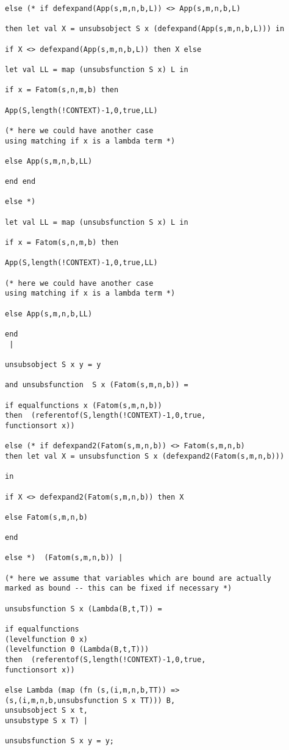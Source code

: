 \documentclass[12pt]{article}
\begin{document}
\begin{verbatim}
else (* if defexpand(App(s,m,n,b,L)) <> App(s,m,n,b,L)

then let val X = unsubsobject S x (defexpand(App(s,m,n,b,L))) in

if X <> defexpand(App(s,m,n,b,L)) then X else

let val LL = map (unsubsfunction S x) L in

if x = Fatom(s,n,m,b) then

App(S,length(!CONTEXT)-1,0,true,LL)

(* here we could have another case
using matching if x is a lambda term *)

else App(s,m,n,b,LL)

end end

else *)

let val LL = map (unsubsfunction S x) L in

if x = Fatom(s,n,m,b) then

App(S,length(!CONTEXT)-1,0,true,LL)

(* here we could have another case
using matching if x is a lambda term *)

else App(s,m,n,b,LL)

end 
 |

unsubsobject S x y = y

and unsubsfunction  S x (Fatom(s,m,n,b)) =

if equalfunctions x (Fatom(s,m,n,b))  
then  (referentof(S,length(!CONTEXT)-1,0,true,
functionsort x))

else (* if defexpand2(Fatom(s,m,n,b)) <> Fatom(s,m,n,b)
then let val X = unsubsfunction S x (defexpand2(Fatom(s,m,n,b)))

in

if X <> defexpand2(Fatom(s,m,n,b)) then X

else Fatom(s,m,n,b)

end

else *)  (Fatom(s,m,n,b)) |

(* here we assume that variables which are bound are actually
marked as bound -- this can be fixed if necessary *)

unsubsfunction S x (Lambda(B,t,T)) =

if equalfunctions 
(levelfunction 0 x)
(levelfunction 0 (Lambda(B,t,T)))
then  (referentof(S,length(!CONTEXT)-1,0,true,
functionsort x))

else Lambda (map (fn (s,(i,m,n,b,TT)) => 
(s,(i,m,n,b,unsubsfunction S x TT))) B,
unsubsobject S x t,
unsubstype S x T) |

unsubsfunction S x y = y;


\end{verbatim}
\end{document}
